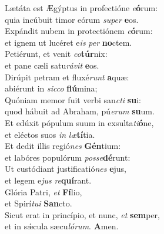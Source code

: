 \oddverse Lætáta est Ægýptus in profectióne \textit{e}\textbf{ó}rum:~\*\\
\oddverse quia incúbuit timor eórum \textit{su}\textit{per} \textbf{e}os.\\
\evenverse Expándit nubem in protectiónem \textit{e}\textbf{ó}rum:~\*\\
\evenverse et ignem ut lucéret e\textit{is} \textit{per} \textbf{no}ctem.\\
\oddverse Petiérunt, et venit \textit{co}\textbf{túr}nix:~\*\\
\oddverse et pane cæli satu\textit{rá}\textit{vit} \textbf{e}os.\\
\evenverse Dirúpit petram et fluxé\textit{runt} \textbf{a}quæ:~\*\\
\evenverse abiérunt in \textit{sic}\textit{co} \textbf{flú}mina;\\
\oddverse Quóniam memor fuit verbi san\textit{cti} \textbf{su}i:~\*\\
\oddverse quod hábuit ad Abraham, pú\textit{e}\textit{rum} \textbf{su}um.\\
\evenverse Et edúxit pópulum suum in exsulta\textit{ti}\textbf{ó}ne,~\*\\
\evenverse et eléctos suos \textit{in} \textit{læ}\textbf{tí}tia.\\
\oddverse Et dedit illis regió\textit{nes} \textbf{Gén}tium:~\*\\
\oddverse et labóres populórum \textit{pos}\textit{se}\textbf{dé}runt:\\
\evenverse Ut custódiant justificatió\textit{nes} \textbf{e}jus,~\*\\
\evenverse et legem e\textit{jus} \textit{re}\textbf{quí}rant.\\
\oddverse Glória Patri, \textit{et} \textbf{Fí}lio,~\*\\
\oddverse et Spirí\textit{tu}\textit{i} \textbf{San}cto.\\
\evenverse Sicut erat in princípio, et nunc, \textit{et} \textbf{sem}per,~\*\\
\evenverse et in sǽcula sæcu\textit{ló}\textit{rum}. \textbf{A}men.\\
